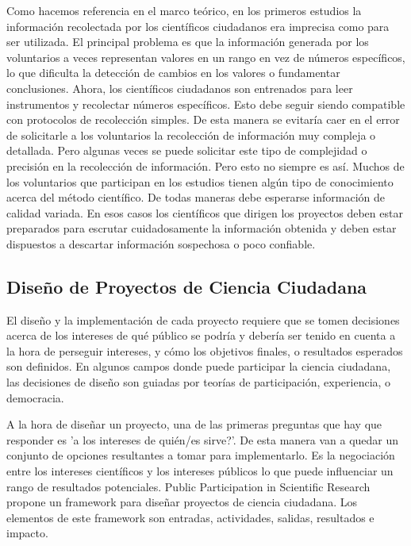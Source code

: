	Como hacemos referencia en el marco teórico, en los primeros estudios la información recolectada por los científicos ciudadanos era imprecisa como para ser utilizada. El principal problema es que la información generada por los voluntarios a veces representan valores en un rango en vez de números específicos, lo que dificulta la detección de cambios en los valores o fundamentar conclusiones. Ahora, los científicos ciudadanos son entrenados para leer instrumentos y recolectar números específicos. Esto debe seguir siendo compatible con protocolos de recolección simples. De esta manera se evitaría caer en el error de solicitarle a los voluntarios la recolección de información muy compleja o detallada. Pero algunas veces se puede solicitar este tipo de complejidad o precisión en la recolección de información. Pero esto no siempre es así. Muchos de los voluntarios que participan en los estudios tienen algún tipo de conocimiento acerca del método científico. De todas maneras debe esperarse información de calidad variada. En esos casos los científicos que dirigen los proyectos deben estar preparados para escrutar cuidadosamente la información obtenida y deben estar dispuestos a descartar información sospechosa o poco confiable.\cite{cohn2008citizen} 
		
\subsection{Diseño de Proyectos de Ciencia Ciudadana}

	El diseño y la implementación de cada proyecto requiere que se tomen decisiones acerca de los intereses de qué público se podría y  debería ser tenido en cuenta a la hora de perseguir intereses, y cómo los objetivos finales, o resultados esperados son definidos. En algunos campos donde puede participar la ciencia ciudadana, las decisiones de diseño son guiadas por teorías de participación, experiencia, o democracia.
	
	A la hora de diseñar un proyecto, una de las primeras preguntas que hay que responder es 'a los intereses de quién/es sirve?'. De esta manera van a quedar un conjunto de opciones resultantes a tomar para implementarlo. Es la negociación entre los intereses científicos y los intereses públicos lo que puede influenciar un rango de resultados potenciales. Public Participation in Scientific Research \cite{shirk2012public} propone un framework para diseñar proyectos de ciencia ciudadana. Los elementos de este framework  son entradas, actividades, salidas, resultados e impacto. 
	
